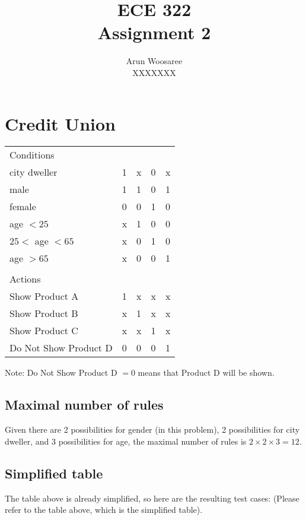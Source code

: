 \documentclass[letterpaper]{article}
\title{ECE 322 \\
Assignment 2}
\author{Arun Woosaree\\
  XXXXXXX}
\begin{document}
\maketitle %

\section{Credit Union}
\begin{adjustbox}{center}
	\begin{tabular}{lllll}
		Conditions            &   &   &   &   \\ \cline{1-1}
		city dweller          & 1 & x & 0 & x \\
		male                  & 1 & 1 & 0 & 1 \\
		female                & 0 & 0 & 1 & 0 \\
		age $<25$             & x & 1 & 0 & 0 \\
		$25<$ age $<65$       & x & 0 & 1 & 0 \\
		age $>65$             & x & 0 & 0 & 1 \\
		                      &   &   &   &   \\
		Actions               &   &   &   &   \\ \cline{1-1}
		Show Product A        & 1 & x & x & x \\
		Show Product B        & x & 1 & x & x \\
		Show Product C        & x & x & 1 & x \\
		Do Not Show Product D & 0 & 0 & 0 & 1 \\
	\end{tabular}%
\end{adjustbox}

Note: Do Not Show Product D $=0$ means that Product D will be shown.

\subsection{Maximal number of rules}
Given there are 2 possibilities for gender (in this problem), 2 possibilities
for city dweller, and 3 possibilities for age, the maximal number of rules is
$2 \times 2 \times 3 = 12$.

\subsection{Simplified table}
The table above is already simplified, so here are the resulting test cases:
(Please refer to the table above, which is the simplified table).
\vspace{20pt}
\end{document}
